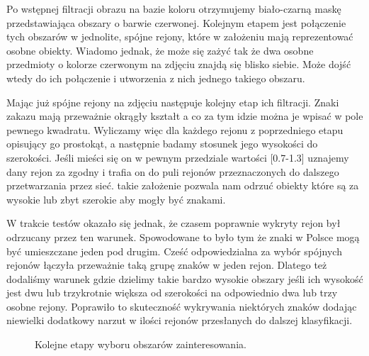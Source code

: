 \documentclass{classrep}
\begin{document}
Po wstępnej filtracji obrazu na bazie koloru otrzymujemy biało-czarną maskę przedstawiająca obszary o barwie czerwonej. Kolejnym etapem jest połączenie tych obszarów w jednolite, spójne rejony, które w założeniu mają reprezentować osobne obiekty. Wiadomo jednak, że może się zażyć tak że dwa osobne przedmioty o kolorze czerwonym na zdjęciu znajdą się blisko siebie. Może dojść wtedy do ich połączenie i utworzenia z nich jednego takiego obszaru.

Mając już spójne rejony na zdjęciu następuje kolejny etap ich filtracji. Znaki zakazu mają przeważnie okrągły kształt a co za tym idzie można je wpisać w pole pewnego kwadratu. Wyliczamy więc dla każdego rejonu z poprzedniego etapu opisujący go prostokąt, a następnie badamy stosunek jego wysokości do szerokości. Jeśli mieści się on w pewnym przedziale wartości [0.7-1.3] uznajemy dany rejon za zgodny i trafia on do puli rejonów przeznaczonych do dalszego przetwarzania przez sieć. takie założenie pozwala nam odrzuć obiekty które są za wysokie lub zbyt szerokie aby mogły być znakami. 

W trakcie testów okazało się jednak, że czasem poprawnie wykryty rejon był odrzucany przez ten warunek. Spowodowane to było tym że znaki w Polsce mogą być umieszczane jeden pod drugim. Cześć odpowiedzialna za wybór spójnych rejonów łączyła przeważnie taką grupę znaków w jeden rejon. Dlatego też dodaliśmy warunek gdzie dzielimy takie bardzo wysokie obszary jeśli ich wysokość jest dwu lub trzykrotnie większa od szerokości na odpowiednio dwa lub trzy osobne rejony. Poprawiło to skuteczność wykrywania niektórych znaków dodając niewielki dodatkowy narzut w ilości rejonów przesłanych do dalszej klasyfikacji.
 \begin{figure}[H]
  \centering
  \caption{Kolejne etapy wyboru obszarów zainteresowania.}
  \label{fig:proc}
\end{figure}
\end{document}
